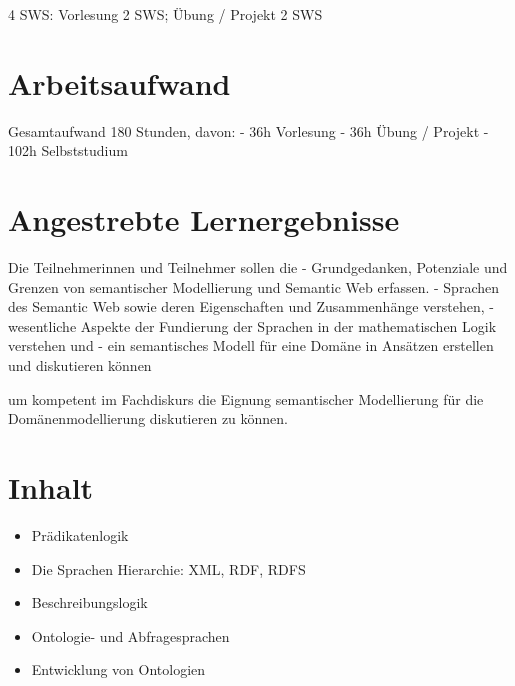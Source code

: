 4 SWS: Vorlesung 2 SWS; Übung / Projekt 2 SWS

\section*{Arbeitsaufwand
\label{/mi-2017/modulbeschreibungen-master/MA_WTW_Modul_Logik-und-semantische-Modellierung}}\label{arbeitsaufwand-pathlabelmi-2017modulbeschreibungen-mastermaux5fwtwux5fmodulux5flogik-und-semantische-modellierung}

Gesamtaufwand 180 Stunden, davon: - 36h Vorlesung - 36h Übung / Projekt
- 102h Selbststudium

\section*{Angestrebte
Lernergebnisse\label{/mi-2017/modulbeschreibungen-master/MA_WTW_Modul_Logik-und-semantische-Modellierung}}\label{angestrebte-lernergebnissepathlabelmi-2017modulbeschreibungen-mastermaux5fwtwux5fmodulux5flogik-und-semantische-modellierung}

Die Teilnehmerinnen und Teilnehmer sollen die - Grundgedanken,
Potenziale und Grenzen von semantischer Modellierung und Semantic Web
erfassen. - Sprachen des Semantic Web sowie deren Eigenschaften und
Zusammenhänge verstehen, - wesentliche Aspekte der Fundierung der
Sprachen in der mathematischen Logik verstehen und - ein semantisches
Modell für eine Domäne in Ansätzen erstellen und diskutieren können

um kompetent im Fachdiskurs die Eignung semantischer Modellierung für
die Domänenmodellierung diskutieren zu können.

\section*{Inhalt\label{/mi-2017/modulbeschreibungen-master/MA_WTW_Modul_Logik-und-semantische-Modellierung}}\label{inhaltpathlabelmi-2017modulbeschreibungen-mastermaux5fwtwux5fmodulux5flogik-und-semantische-modellierung}

\begin{itemize}
\tightlist
\item
  Prädikatenlogik
\item
  Die Sprachen Hierarchie: XML, RDF, RDFS
\item
  Beschreibungslogik
\item
  Ontologie- und Abfragesprachen
\item
  Entwicklung von Ontologien
\end{itemize}

